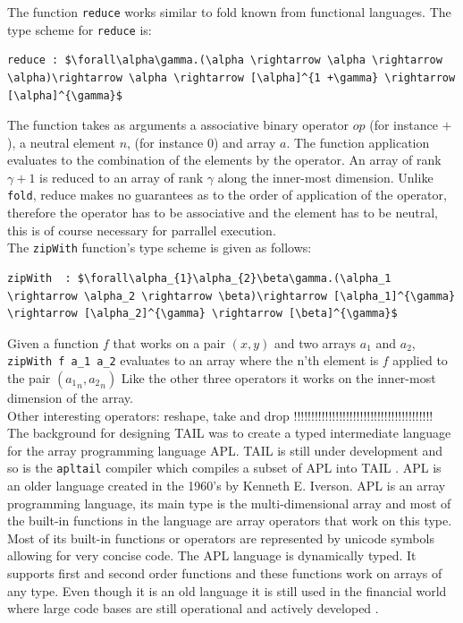 \documentclass[11pt]{article}
\begin{document}
The function {\tt reduce} works similar to fold known from functional languages. The type scheme for {\tt reduce} is:
\begin{lstlisting}[numbers=none,frame=none]
reduce : $\forall\alpha\gamma.(\alpha \rightarrow \alpha \rightarrow \alpha)\rightarrow \alpha \rightarrow [\alpha]^{1 +\gamma} \rightarrow [\alpha]^{\gamma}$
\end{lstlisting}
The function takes as arguments a associative binary operator $op$ (for instance $+$), a neutral element $n$, (for instance 0) and array $a$.
The function application evaluates to the combination of the elements by the operator.
An array of rank $\gamma+1$ is reduced to an array of rank $\gamma$ along the inner-most dimension.
Unlike {\tt fold}, reduce makes no guarantees as to the order of application of the operator, therefore the operator has to be associative and the element has to be neutral, this is of course necessary for parrallel execution.\\

The {\tt zipWith} function's type scheme is given as follows: 
\begin{lstlisting}[numbers=none,frame=none]
zipWith  : $\forall\alpha_{1}\alpha_{2}\beta\gamma.(\alpha_1 \rightarrow \alpha_2 \rightarrow \beta)\rightarrow [\alpha_1]^{\gamma} \rightarrow [\alpha_2]^{\gamma} \rightarrow [\beta]^{\gamma}$
\end{lstlisting}
Given a function $f$ that works on a pair $(x,y)$ and two arrays $a_1$ and $a_2$, {\tt zipWith f a\_1 a\_2}  evaluates to an array where the n'th element is $f$ applied to the pair $({a_{1}}_n,{a_{2}}_n)$ 
Like the other three operators it works on the inner-most dimension of the array\cite{ElsmanDybdal:Array:2014}.\\

Other interesting operators: reshape, take and drop !!!!!!!!!!!!!!!!!!!!!!!!!!!!!!!!!!!!!!!!\\

The background for designing TAIL was to create a typed intermediate language for the array programming language APL. TAIL is still under development and so is the {\tt apltail} compiler which compiles a subset of APL into TAIL \cite{ElsmanDybdal:Array:2014}.
APL is an older language created in the 1960's by Kenneth E. Iverson.
APL is an array programming language, its main type is the multi-dimensional array 
and most of the built-in functions in the language are array operators that work on this type. 
Most of its built-in functions or operators are represented by unicode symbols allowing for very concise code.
The APL language is dynamically typed. It supports first and second order functions and these functions work on arrays of any type. 
Even though it is an old language it is still used in the financial world 
where large code bases are still operational and actively developed \cite{ElsmanDybdal:Array:2014}. \\
\end{document}
